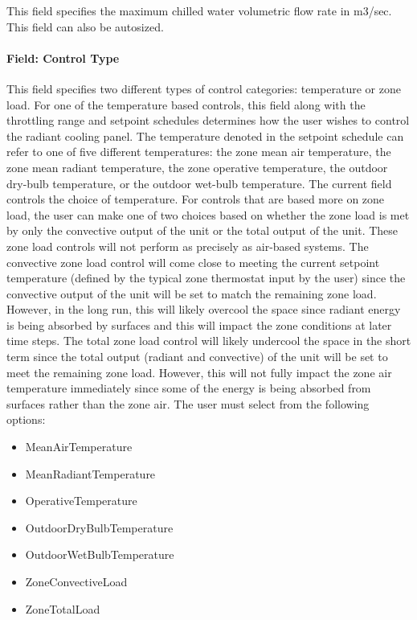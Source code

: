 This field specifies the maximum chilled water volumetric flow rate in m3/sec.  This field can also be autosized.

\paragraph{Field: Control Type}

This field specifies two different types of control categories: temperature or zone load.  For one of the temperature based controls, this field along with the throttling range and setpoint schedules determines how the user wishes to control the radiant cooling panel.  The temperature denoted in the setpoint schedule can refer to one of five different temperatures: the zone mean air temperature, the zone mean radiant temperature, the zone operative temperature, the outdoor dry-bulb temperature, or the outdoor wet-bulb temperature.  The current field controls the choice of temperature.  For controls that are based more on zone load, the user can make one of two choices based on whether the zone load is met by only the convective output of the unit or the total output of the unit.  These zone load controls will not perform as precisely as air-based systems.  The convective zone load control will come close to meeting the current setpoint temperature (defined by the typical zone thermostat input by the user) since the convective output of the unit will be set to match the remaining zone load.  However, in the long run, this will likely overcool the space since radiant energy is being absorbed by surfaces and this will impact the zone conditions at later time steps.  The total zone load control will likely undercool the space in the short term since the total output (radiant and convective) of the unit will be set to meet the remaining zone load.  However, this will not fully impact the zone air temperature immediately since some of the energy is being absorbed from surfaces rather than the zone air.  The user must select from the following options:

\begin{itemize}
\tightlist
\item
  MeanAirTemperature
\item
  MeanRadiantTemperature
\item
  OperativeTemperature
\item
  OutdoorDryBulbTemperature
\item
  OutdoorWetBulbTemperature
\item
  ZoneConvectiveLoad
\item
  ZoneTotalLoad
\end{itemize}

